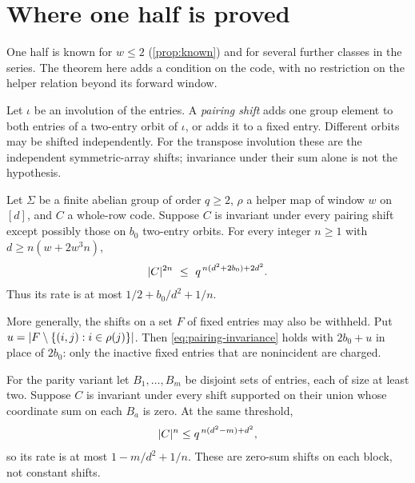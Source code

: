\section{Where one half is proved}\label{sec:invariance}

One half is known for $w\le2$ (\cref{prop:known}) and for several further classes in the series. The theorem here
adds a condition on the code, with no restriction on the helper relation beyond its forward window.

Let $\iota$ be an involution of the entries. A \emph{pairing shift} adds one group element to both entries of a
two-entry orbit of $\iota$, or adds it to a fixed entry. Different orbits may be shifted independently. For the
transpose involution these are the independent symmetric-array shifts; invariance under their sum alone is not
the hypothesis.

\begin{theorem}\label{thm:I}
Let $\Sigma$ be a finite abelian group of order $q\ge2$, $\rho$ a helper map of window $w$ on $[d]$, and $C$ a
whole-row code. Suppose $C$ is invariant under every pairing shift except possibly those on $b_0$ two-entry orbits.
For every integer $n\ge1$ with $d\ge n(w+2w^3n)$,
\begin{equation}\label{eq:pairing-invariance}
  \lvert C \rvert^{2n}\ \le\ q^{\,n(d^2+2b_0)+2d^2}.
\end{equation}
Thus its rate is at most $1/2+b_0/d^2+1/n$.

More generally, the shifts on a set $F$ of fixed entries may also be withheld. Put
$u=\lvert F\setminus\{(i,j):i\in\rho(j)\} \rvert$. Then \eqref{eq:pairing-invariance} holds with $2b_0+u$ in place of
$2b_0$: only the inactive fixed entries that are nonincident are charged.

For the parity variant let $B_1,\ldots,B_m$ be disjoint sets of entries, each of size at least two. Suppose $C$ is
invariant under every shift supported on their union whose coordinate sum on each $B_a$ is zero. At the same
threshold,
\begin{equation}\label{eq:parity-invariance}
 \lvert C \rvert^n\le q^{\,n(d^2-m)+d^2},
\end{equation}
so its rate is at most $1-m/d^2+1/n$. These are zero-sum shifts on each block, not constant shifts.
\end{theorem}

